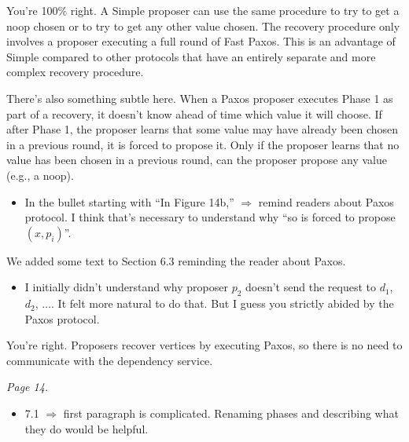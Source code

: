 \documentclass[letterpaper,twocolumn,10pt]{article}
\newenvironment{reviewerquote}
{\list{}{\leftmargin=\parindent\rightmargin=0in}\item[] \itshape \color{ReviewerDarkGray}}%
{\endlist}
\begin{document}
You're 100\% right. A Simple \BPaxos{} proposer can use the same procedure to
try to get a noop chosen or to try to get any other value chosen. The recovery
procedure only involves a proposer executing a full round of Fast Paxos. This
is an advantage of Simple \BPaxos{} compared to other protocols that have an
entirely separate and more complex recovery procedure.

There's also something subtle here. When a Paxos proposer executes Phase 1 as
part of a recovery, it doesn't know ahead of time which value it will choose.
If after Phase 1, the proposer learns that some value may have already been
chosen in a previous round, it is forced to propose it. Only if the proposer
learns that no value has been chosen in a previous round, can the proposer
propose any value (e.g., a noop).

\begin{reviewerquote}
  \begin{itemize}
    \item
      In the bullet starting with ``In Figure 14b,'' $\Rightarrow$ remind
      readers about Paxos protocol. I think that's necessary to understand why
      ``so is forced to propose $(x, p_i)$''.
  \end{itemize}
\end{reviewerquote}

We added some text to Section 6.3 reminding the reader about Paxos.

\begin{reviewerquote}
  \begin{itemize}
    \item
      I initially didn't understand why proposer $p_2$ doesn't send the request
      to $d_1$, $d_2$, $\ldots$. It felt more natural to do that. But I guess
      you strictly abided by the Paxos protocol.
  \end{itemize}
\end{reviewerquote}

You're right. Proposers recover vertices by executing Paxos, so there is no
need to communicate with the dependency service.

\begin{reviewerquote}
  Page 14.

  \begin{itemize}
    \item
      7.1 $\Rightarrow$ first paragraph is complicated. Renaming phases and
      describing what they do would be helpful.
  \end{itemize}
\end{reviewerquote}
\end{document}
